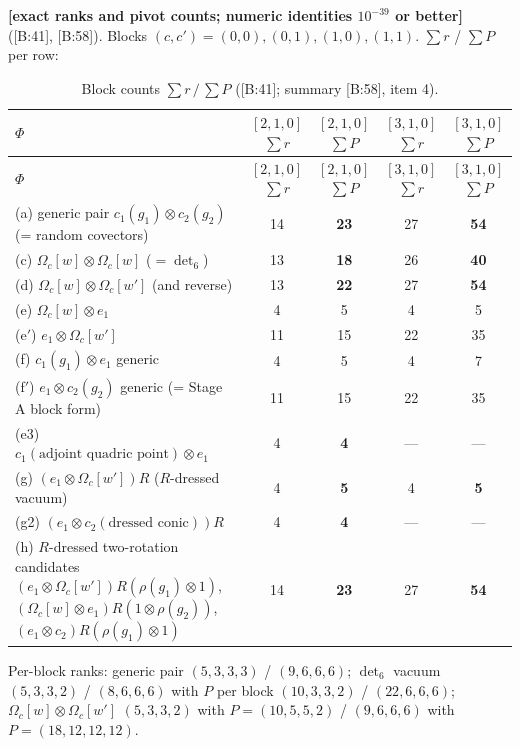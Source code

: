 \documentclass[10pt]{article}
\newcommand{\cl}[2]{\textsf{[#1:#2]}}
\newcommand{\tg}[1]{\textbf{[#1]}}
\newcommand{\Om}{\Omega}
\begin{document}
\tg{exact ranks and pivot counts; numeric identities $10^{-39}$ or better} (\cl{B}{41}, \cl{B}{58}). Blocks $(c,c')=(0,0),(0,1),(1,0),(1,1)$. $\sum r$ / $\sum P$ per row:
\begin{center}\small\setlength{\tabcolsep}{4pt}\begin{longtable}{@{}p{6.6cm}cccc@{}}
\caption{Block counts $\sum r\,/\,\sum P$ (\cl{B}{41}; summary \cl{B}{58}, item 4).}\label{tab:Bblocks}\\\toprule
$\Phi$ & $[2,1,0]$ $\sum r$ & $[2,1,0]$ $\sum P$ & $[3,1,0]$ $\sum r$ & $[3,1,0]$ $\sum P$ \\\midrule\endfirsthead
$\Phi$ & $[2,1,0]$ $\sum r$ & $[2,1,0]$ $\sum P$ & $[3,1,0]$ $\sum r$ & $[3,1,0]$ $\sum P$ \\\midrule\endhead
(a) generic pair $c_1(g_1)\otimes c_2(g_2)$ (= random covectors) & 14 & \textbf{23} & 27 & \textbf{54} \\
(c) $\Om_c[w]\otimes\Om_c[w]$ ($=\det_6$) & 13 & \textbf{18} & 26 & \textbf{40} \\
(d) $\Om_c[w]\otimes\Om_c[w']$ (and reverse) & 13 & \textbf{22} & 27 & \textbf{54} \\
(e) $\Om_c[w]\otimes e_1$ & 4 & 5 & 4 & 5 \\
(e$'$) $e_1\otimes\Om_c[w']$ & 11 & 15 & 22 & 35 \\
(f) $c_1(g_1)\otimes e_1$ generic & 4 & 5 & 4 & 7 \\
(f$'$) $e_1\otimes c_2(g_2)$ generic (= Stage A block form) & 11 & 15 & 22 & 35 \\
(e3) $c_1(\text{adjoint quadric point})\otimes e_1$ & 4 & \textbf{4} & --- & --- \\
(g) $(e_1\otimes\Om_c[w'])R$ ($R$-dressed vacuum) & 4 & \textbf{5} & 4 & \textbf{5} \\
(g2) $(e_1\otimes c_2(\text{dressed conic}))R$ & 4 & \textbf{4} & --- & --- \\
(h) $R$-dressed two-rotation candidates $(e_1\otimes\Om_c[w'])R(\rho(g_1)\otimes1)$, $(\Om_c[w]\otimes e_1)R(1\otimes\rho(g_2))$, $(e_1\otimes c_2)R(\rho(g_1)\otimes1)$ & 14 & \textbf{23} & 27 & \textbf{54} \\
\bottomrule
\end{longtable}\end{center}
Per-block ranks: generic pair $(5,3,3,3)$ / $(9,6,6,6)$; $\det_6$ vacuum $(5,3,3,2)$ / $(8,6,6,6)$ with $P$ per block $(10,3,3,2)$ / $(22,6,6,6)$; $\Om_c[w]\otimes\Om_c[w']$ $(5,3,3,2)$ with $P=(10,5,5,2)$ / $(9,6,6,6)$ with $P=(18,12,12,12)$.
\end{document}
